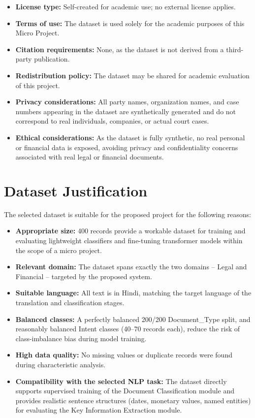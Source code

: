 \begin{itemize}
    \item \textbf{License type:} Self-created for academic use; no external license applies.
    \item \textbf{Terms of use:} The dataset is used solely for the academic purposes of this Micro Project.
    \item \textbf{Citation requirements:} None, as the dataset is not derived from a third-party publication.
    \item \textbf{Redistribution policy:} The dataset may be shared for academic evaluation of this project.
    \item \textbf{Privacy considerations:} All party names, organization names, and case numbers appearing in the dataset are synthetically generated and do not correspond to real individuals, companies, or actual court cases.
    \item \textbf{Ethical considerations:} As the dataset is fully synthetic, no real personal or financial data is exposed, avoiding privacy and confidentiality concerns associated with real legal or financial documents.
\end{itemize}


\section{Dataset Justification}

The selected dataset is suitable for the proposed project for the following reasons:

\begin{itemize}
    \item \textbf{Appropriate size:} 400 records provide a workable dataset for training and evaluating lightweight classifiers and fine-tuning transformer models within the scope of a micro project.
    \item \textbf{Relevant domain:} The dataset spans exactly the two domains -- Legal and Financial -- targeted by the proposed system.
    \item \textbf{Suitable language:} All text is in Hindi, matching the target language of the translation and classification stages.
    \item \textbf{Balanced classes:} A perfectly balanced 200/200 Document\_Type split, and reasonably balanced Intent classes (40--70 records each), reduce the risk of class-imbalance bias during model training.
    \item \textbf{High data quality:} No missing values or duplicate records were found during characteristic analysis.
    \item \textbf{Compatibility with the selected NLP task:} The dataset directly supports supervised training of the Document Classification module and provides realistic sentence structures (dates, monetary values, named entities) for evaluating the Key Information Extraction module.
\end{itemize}

